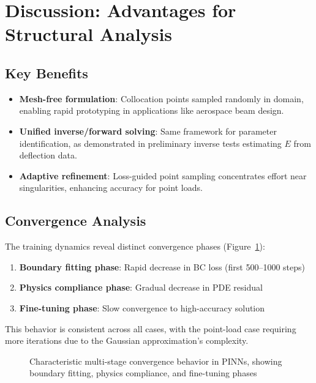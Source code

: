 \documentclass[twocolumn]{svjour3}
\begin{document}
	\section{Discussion: Advantages for Structural Analysis}\label{sec:results}
	\subsection{Key Benefits}
	\begin{itemize}
		\item \textbf{Mesh-free formulation}: Collocation points sampled randomly in domain, enabling rapid prototyping in applications like aerospace beam design.
		\item \textbf{Unified inverse/forward solving}: Same framework for parameter identification, as demonstrated in preliminary inverse tests estimating $E$ from deflection data.
		\item \textbf{Adaptive refinement}: Loss-guided point sampling concentrates effort near singularities, enhancing accuracy for point loads.
	\end{itemize}
	
	\subsection{Convergence Analysis}
	The training dynamics reveal distinct convergence phases (Figure~\ref{fig:convergence_stages}):
	\begin{enumerate}
		\item \textbf{Boundary fitting phase}: Rapid decrease in BC loss (first 500--1000 steps)
		\item \textbf{Physics compliance phase}: Gradual decrease in PDE residual
		\item \textbf{Fine-tuning phase}: Slow convergence to high-accuracy solution
	\end{enumerate}
	This behavior is consistent across all cases, with the point-load case requiring more iterations due to the Gaussian approximation's complexity.
	
	\begin{figure}[htbp]
		\centering
		\caption{Characteristic multi-stage convergence behavior in PINNs, showing boundary fitting, physics compliance, and fine-tuning phases}\label{fig:convergence_stages}
	\end{figure}
	
\end{document}
